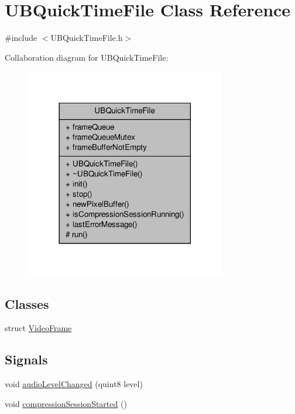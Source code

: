 \hypertarget{class_u_b_quick_time_file}{\section{U\-B\-Quick\-Time\-File Class Reference}
\label{dc/d83/class_u_b_quick_time_file}
}


{\ttfamily \#include $<$U\-B\-Quick\-Time\-File.\-h$>$}



Collaboration diagram for U\-B\-Quick\-Time\-File\-:
\nopagebreak
\begin{figure}[H]
\begin{center}
\leavevmode
\includegraphics[width=248pt]{d1/d3a/class_u_b_quick_time_file__coll__graph}
\end{center}
\end{figure}
\subsection*{Classes}
\begin{DoxyCompactItemize}
\item 
struct \hyperlink{struct_u_b_quick_time_file_1_1_video_frame}{Video\-Frame}
\end{DoxyCompactItemize}
\subsection*{Signals}
\begin{DoxyCompactItemize}
\item 
void \hyperlink{class_u_b_quick_time_file_aefaf4dded33e2b141bad9d84f1b5f79b}{audio\-Level\-Changed} (quint8 level)
\item 
void \hyperlink{class_u_b_quick_time_file_a18d2ed94e9a361ddff1c33e86d6ee223}{compression\-Session\-Started} ()
\end{DoxyCompactItemize}
